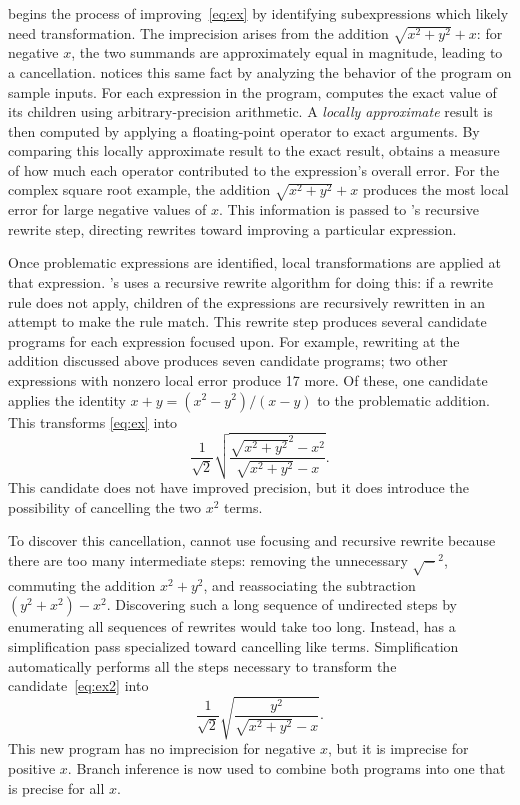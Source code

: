 \documentclass[paper.tex]{subfiles}
\begin{document}
\casio begins the process of improving~\eqref{eq:ex}
  by identifying subexpressions
  which likely need transformation.
The imprecision arises from the addition $\sqrt{x^2 + y^2} + x$:
  for negative $x$,
  the two summands are approximately equal in magnitude,
  leading to a cancellation.
\casio notices this same fact
  by analyzing the behavior of the program on sample inputs.
For each expression in the program,
  \casio computes the exact value of its children
  using arbitrary-precision arithmetic.
A \emph{locally approximate} result is then computed
  by applying a floating-point operator to exact arguments.
By comparing this locally approximate result to the exact result,
  \casio obtains a measure of how much each operator
  contributed to the expression's overall error.
For the complex square root example,
  the addition $\sqrt{x^2 + y^2} + x$ produces the most local error
  for large negative values of $x$.
This information is passed to \casio's recursive rewrite step,
  directing rewrites toward improving a particular expression.

Once problematic expressions are identified,
  local transformations are applied at that expression.
\casio's uses a recursive rewrite algorithm for doing this:
  if a rewrite rule does not apply,
  children of the expressions are recursively rewritten
  in an attempt to make the rule match.
This rewrite step produces several candidate programs
  for each expression focused upon.
For example, rewriting at the addition discussed above
  produces seven candidate programs;
  two other expressions with nonzero local error produce 17 more.
Of these, one candidate applies the identity
  $x + y = (x^2 - y^2) / (x - y)$ to the problematic addition.
This transforms \eqref{eq:ex} into
\begin{equation} \label{eq:ex2}
  \frac1{\sqrt2} \sqrt{\frac{\sqrt{x^2 + y^2}^2 - x^2}{\sqrt{x^2 + y^2} - x}}.
\end{equation}
This candidate does not have improved precision,
  but it does introduce the possibility
  of cancelling the two $x^2$ terms.

To discover this cancellation,
  \casio cannot use focusing and recursive rewrite
  because there are too many intermediate steps:
  removing the unnecessary $\sqrt{-}^2$,
  commuting the addition $x^2 + y^2$,
  and reassociating the subtraction $(y^2 + x^2) - x^2$.
Discovering such a long sequence of undirected steps
  by enumerating all sequences of rewrites
  would take too long.
Instead, \casio has a simplification pass
  specialized toward cancelling like terms.
Simplification automatically performs all the steps necessary
  to transform the candidate~\eqref{eq:ex2} into
\begin{equation} \label{eq:ex3}
  \frac1{\sqrt2} \sqrt{\frac{y^2}{\sqrt{x^2 + y^2} - x}}.
\end{equation}
This new program has no imprecision for negative $x$,
  but it is imprecise for positive $x$.
Branch inference is now used to combine both programs
  into one that is precise for all $x$.
\end{document}
